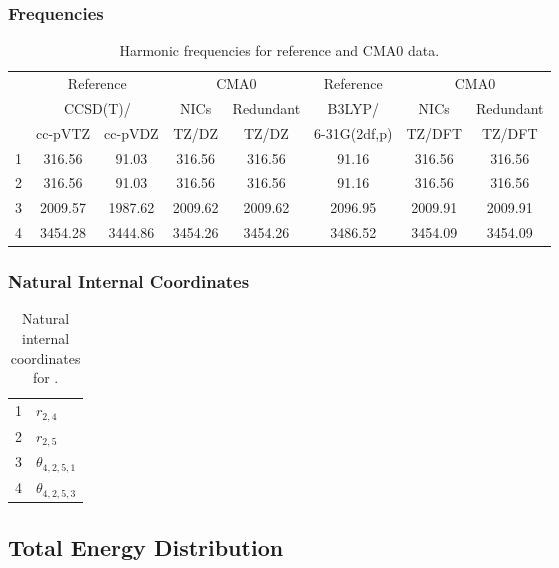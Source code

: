 \documentclass[10pt,oneside]{article}
\begin{document}
\begin{table}[h!]
\subsubsection*{Frequencies}
\centering
\caption{Harmonic frequencies for reference and CMA0 data.}
\begin{tabular}{cccccccc}
\toprule
{} & \multicolumn{2}{c}{Reference} & \multicolumn{2}{c}{CMA0} &    Reference & \multicolumn{2}{c}{CMA0} \\
{} & \multicolumn{2}{c}{CCSD(T)/} &    NICs &  Redundant &       B3LYP/ &    NICs & Redundant \\
{} &   cc-pVTZ & cc-pVDZ &   TZ/DZ &      TZ/DZ & 6-31G(2df,p) &  TZ/DFT &    TZ/DFT \\
\midrule
1 &    316.56 &   91.03 &  316.56 &     316.56 &        91.16 &  316.56 &    316.56 \\
2 &    316.56 &   91.03 &  316.56 &     316.56 &        91.16 &  316.56 &    316.56 \\
3 &   2009.57 & 1987.62 & 2009.62 &    2009.62 &      2096.95 & 2009.91 &   2009.91 \\
4 &   3454.28 & 3444.86 & 3454.26 &    3454.26 &      3486.52 & 3454.09 &   3454.09 \\
\bottomrule
\end{tabular}
\end{table}

\begin{table}[h!]
\subsubsection*{Natural Internal Coordinates}
\centering
\caption{Natural internal coordinates for .}
\small
\begin{tabular}{ll}
\toprule
  1   & $r_{2,4}$ \\
  2   & $r_{2,5}$ \\
  3   & $\theta_{4,2,5,1}$ \\
  4   & $\theta_{4,2,5,3}$ \\
\bottomrule
\end{tabular}
\end{table}

\begin{table}
\subsection*{Total Energy Distribution}
\centering\end{table}
\end{document}
